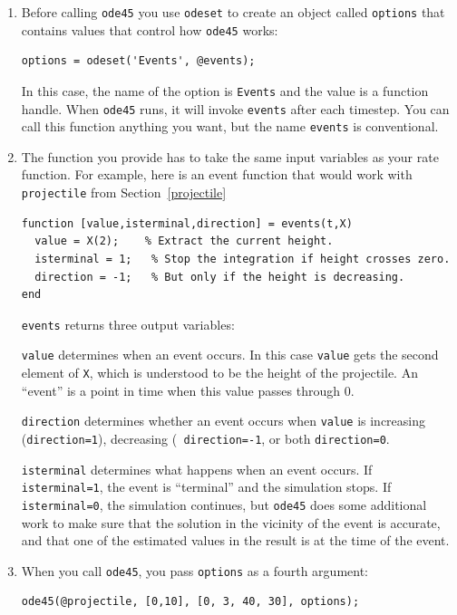 \documentclass{book}
\begin{document}
\begin{enumerate}

\item Before calling {\tt ode45} you use {\tt odeset} to create an
object called {\tt options} that contains values that control
how {\tt ode45} works:

\begin{verbatim}
options = odeset('Events', @events);
\end{verbatim}
%
In this case, the name of the option is {\tt Events} and the
value is a function handle. When {\tt ode45} runs, it will invoke
{\tt events} after each timestep.
You can call this function anything you want, but the name
{\tt events} is conventional.

\item The function you provide has to take
the same input variables as your rate function. For example,
here is an event function that would work with {\tt projectile}
from Section~\ref{projectile}

\begin{verbatim}
function [value,isterminal,direction] = events(t,X)
  value = X(2);    % Extract the current height.
  isterminal = 1;   % Stop the integration if height crosses zero.
  direction = -1;   % But only if the height is decreasing.
end
\end{verbatim}

{\tt events} returns three output variables:

{\tt value} determines
when an event occurs. In this case {\tt value} gets the second
element of {\tt X}, which is understood to be the height of the
projectile. An ``event'' is a point in time when this value passes
through 0.

{\tt direction} determines whether an event occurs when
{\tt value} is increasing ({\tt direction=1}), decreasing ({\tt
direction=-1}, or both {\tt direction=0}.

{\tt isterminal} determines what happens when an event
occurs. If {\tt isterminal=1}, the event is ``terminal'' and the
simulation stops. If {\tt isterminal=0}, the simulation continues,
but {\tt ode45} does some additional work to make sure that the
solution in the vicinity of the event is accurate, and that one of the
estimated values in the result is at the time of the event.

\item When you call {\tt ode45}, you pass {\tt options} as a fourth
argument:

\begin{verbatim}
ode45(@projectile, [0,10], [0, 3, 40, 30], options);
\end{verbatim}
%
\end{enumerate}
\end{document}
